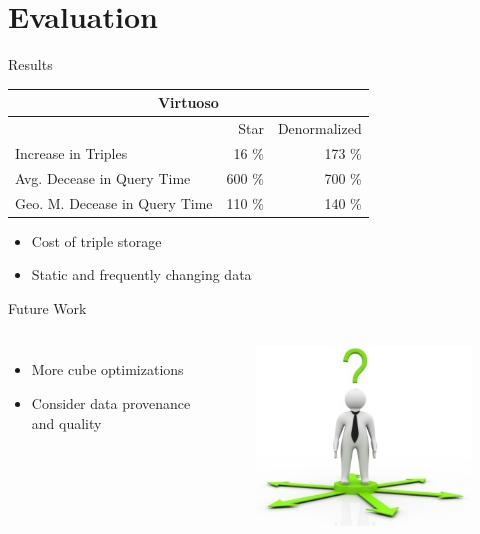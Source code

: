 \section{Evaluation}
\begin{frame}{Results}
\begin{table}
    \begin{tabular}{l|r|r}
    \hline
    \multicolumn{3}{c}{Virtuoso} \\ \hline
    ~        & Star & Denormalized \\ \hline
    Increase in Triples  & 16 \%     & 173 \%       \\
    Avg. Decease in Query Time     & 600 \%    & 700 \%       \\
    Geo. M. Decease in Query Time & 110 \%    & 140 \%       \\
    \end{tabular}
\end{table}
\begin{itemize}
    \item Cost of triple storage
    \item Static and frequently changing data
\end{itemize}
\end{frame}




\newcommand{\conc}{Future Work}
\begin{frame}{\conc}
\begin{columns}
\begin{itemize}
    \item More cube optimizations
    \item Consider data provenance and quality
\end{itemize}
\begin{figure}
\includegraphics[width=\textwidth]{images/The-present-of-work.jpg}
\end{figure}
\end{columns}


\end{frame}

